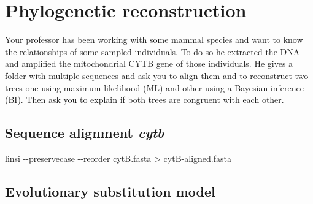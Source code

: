 \documentclass[
  letterpaper,
  DIV=11,
  numbers=noendperiod]{scrreprt}
\newenvironment{Shaded}{\begin{snugshade}}{\end{snugshade}}
\newcommand{\AttributeTok}[1]{\textcolor[rgb]{0.40,0.46,0.14}{#1}}
\newcommand{\ExtensionTok}[1]{\textcolor[rgb]{0.00,0.46,0.62}{#1}}
\newcommand{\NormalTok}[1]{\textcolor[rgb]{0.00,0.46,0.62}{#1}}
\newcommand{\OperatorTok}[1]{\textcolor[rgb]{0.37,0.37,0.37}{#1}}
\begin{document}
\hypertarget{phylogenetic-reconstruction}{%
\chapter{Phylogenetic
reconstruction}\label{phylogenetic-reconstruction}}

\begin{tcolorbox}[standard jigsaw,rightrule=.15mm, bottomtitle=1mm, toprule=.15mm, titlerule=0mm, toptitle=1mm, opacitybacktitle=0.6, arc=.35mm, colframe=quarto-callout-warning-color-frame, colbacktitle=quarto-callout-warning-color!10!white, coltitle=black, title=\textcolor{quarto-callout-warning-color}{\faExclamationTriangle}\hspace{0.5em}{Challenge}, bottomrule=.15mm, colback=white, leftrule=.75mm, left=2mm, opacityback=0]
Your professor has been working with some mammal species and want to
know the relationships of some sampled individuals. To do so he
extracted the DNA and amplified the mitochondrial CYTB gene of those
individuals. He gives a folder with multiple sequences and ask you to
align them and to reconstruct two trees one using maximum likelihood
(ML) and other using a Bayesian inference (BI). Then ask you to explain
if both trees are congruent with each other.
\end{tcolorbox}

\hypertarget{sequence-alignment-cytb}{%
\section*{\texorpdfstring{Sequence alignment
\emph{cytb}}{Sequence alignment cytb}}\label{sequence-alignment-cytb}}

\begin{Shaded}
\begin{Highlighting}[]
\ExtensionTok{linsi} \AttributeTok{{-}{-}preservecase} \AttributeTok{{-}{-}reorder}\NormalTok{ cytB.fasta }\OperatorTok{\textgreater{}}\NormalTok{ cytB{-}aligned.fasta}
\end{Highlighting}
\end{Shaded}

\hypertarget{evolutionary-substitution-model}{%
\section*{Evolutionary substitution
model}\label{evolutionary-substitution-model}}
\end{document}
